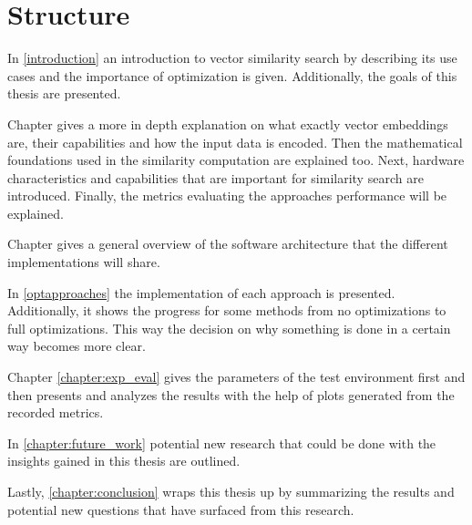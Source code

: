 
\section{Structure}
In \autoref{introduction} an introduction to vector similarity search by describing its use cases and the importance of optimization is given. Additionally, the goals of this thesis are presented.

Chapter  gives a more in depth explanation on what exactly vector embeddings are, their capabilities and how the input data is encoded. Then the mathematical foundations used in the similarity computation are explained too. Next, hardware characteristics and capabilities that are important for similarity search are introduced. Finally, the metrics evaluating the approaches performance will be explained.

Chapter  gives a general overview of the software architecture that the different implementations will share.

In \autoref{optapproaches} the implementation of each approach is presented. Additionally, it shows the progress for some methods from no optimizations to full optimizations. This way the decision on why something is done in a certain way becomes more clear.

Chapter \ref{chapter:exp_eval} gives the parameters of the test environment first and then presents and analyzes the results with the help of plots generated from the recorded metrics.

In \autoref{chapter:future_work} potential new research that could be done with the insights gained in this thesis are outlined.

Lastly, \autoref{chapter:conclusion} wraps this thesis up by summarizing the results and potential new questions that have surfaced from this research.